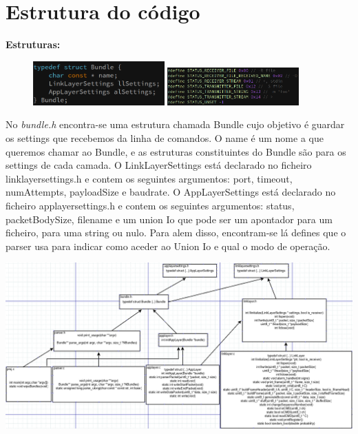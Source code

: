 \documentclass[a4paper]{article}
\begin{document}
\section{Estrutura do código}
\textbf{Estruturas:}\\
\begin{figure}
  \begin{center}
    \includegraphics[width=0.45\textwidth]{bundleStruct.png}
    \includegraphics[width=0.45\textwidth]{status.png}
  \end{center}
\end{figure}
No \textit{bundle.h} encontra-se uma estrutura chamada Bundle cujo
objetivo é guardar os settings que recebemos da linha de comandos.
O name é um nome a que queremos chamar ao Bundle, e as estruturas
constituintes do Bundle são para os settings de cada camada. O
LinkLayerSettings está declarado no ficheiro linklayersettings.h e contem os
seguintes argumentos: port, timeout, numAttempts, payloadSize e baudrate.
O AppLayerSettings está declarado no ficheiro applayersettings.h e contem os
seguintes argumentos: status, packetBodySize, filename e um union Io que pode
ser um apontador para um ficheiro, para uma string ou nulo. Para alem disso,
encontram-se lá defines que o parser usa para indicar como aceder ao Union Io e
qual o modo de operação.\\\newline




\centerline{\includegraphics[scale=0.70]{organizacaoFicheirosECodigo.png}}
\end{document}

